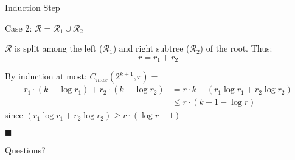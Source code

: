 \documentclass[10pt]{beamer}
\newcommand*{\QED}{\hfill\ensuremath{\blacksquare}}%
\begin{document}
\begin{frame}{Induction Step}
  \begin{block}{Case 2: $\mathcal{R} = \mathcal{R}_1 \cup \mathcal{R}_2$}
    \begin{center}
    \end{center}

    $\mathcal{R}$ is split among the left ($\mathcal{R}_1$) and right subtree ($\mathcal{R}_2$) of the root. Thus:
    \begin{equation}
      r = r_1 + r_2
    \end{equation}

    By induction at most: $C_{max}(2^{k+1},r) = $
    \begin{equation}\begin{split}
      r_1 \cdot (k - \log r_1) + r_2 \cdot (k - \log r_2) & = r \cdot k - (r_1 \log r_1 + r_2 \log r_2)\\
      & \leq r \cdot (k + 1 - \log r)
    \end{split}\end{equation}
    since $(r_1 \log r_1 + r_2 \log r_2) \geq r \cdot (\log r - 1)$

    \QED
  \end{block}
\end{frame}


\begin{frame}[standout]
  Questions?
\end{frame}
\end{document}
